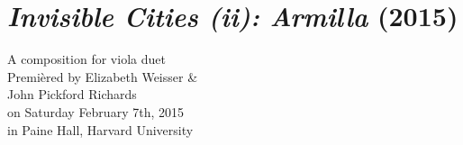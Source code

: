 \chapter{\emph{Invisible Cities (ii): Armilla} (2015)}

\begin{singlespacing}
\begin{flushright}
A composition for viola duet \\
\vspace*{\baselineskip}
Premi\`{e}red by Elizabeth Weisser \& \\
John Pickford Richards \\
on Saturday February 7th, 2015 \\
in Paine Hall, Harvard University
\end{flushright}
\end{singlespacing}

